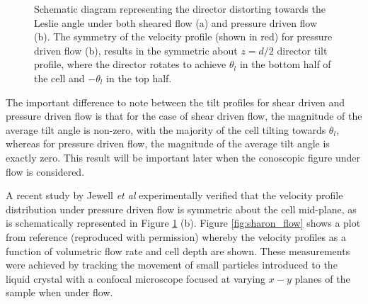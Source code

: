 \begin{figure}
\begin{center}
\hspace{0.5in}
\end{center}
\caption[Comparison of flow profiles. Shear flow and pressure-driven flow]{\label{fig:c_p}Schematic diagram representing the director distorting towards the Leslie angle under both sheared flow (a) and pressure driven flow (b). The symmetry of the velocity profile (shown in red) for pressure driven flow (b), results in the symmetric about $z=d/2$ director tilt profile, where the director rotates to achieve $\theta_l$ in the bottom half of the cell and $-\theta_l$ in the top half.}
\end{figure}

The important difference to note between the tilt profiles for shear driven and pressure driven flow is that for the case of shear driven flow, the magnitude of the average tilt angle is non-zero, with the majority of the cell tilting towards $\theta_l$, whereas for pressure driven flow, the magnitude of the average tilt angle is exactly zero. This result will be important later when the conoscopic figure under flow is considered.

A recent study by Jewell \textit{et al} \cite{Jewell2009} experimentally verified that the velocity profile distribution under pressure driven flow is symmetric about the cell mid-plane, as is schematically represented in Figure \ref{fig:c_p} (b). Figure \ref{fig:sharon_flow} shows a plot from reference \cite{Jewell2009} (reproduced with permission) whereby the velocity profiles as a function of volumetric flow rate and cell depth are shown. These measurements were achieved by tracking the movement of small particles introduced to the liquid crystal with a confocal microscope focused at varying $x-y$ planes of the sample when under flow.   

